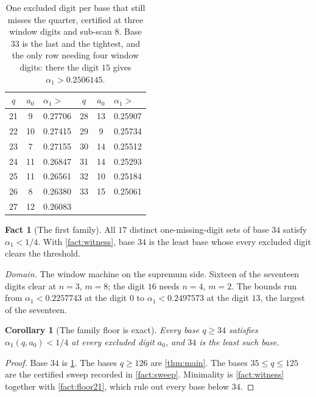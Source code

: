 \documentclass[11pt]{amsart}
\newtheorem{corollary}[theorem]{Corollary}
\theoremstyle{definition}
\newtheorem{fact}[theorem]{Fact}
\theoremstyle{remark}
\begin{document}
\begin{table}[t]
\centering
\small
\begin{tabular}{ccl@{\qquad}ccl}
\toprule
$q$ & $a_{0}$ & $\alpha_{1} >$ & $q$ & $a_{0}$ & $\alpha_{1} >$ \\
\midrule
21 & 9  & 0.27706 & 28 & 13 & 0.25907 \\
22 & 10 & 0.27415 & 29 & 9  & 0.25734 \\
23 & 7  & 0.27155 & 30 & 14 & 0.25512 \\
24 & 11 & 0.26847 & 31 & 14 & 0.25293 \\
25 & 11 & 0.26561 & 32 & 10 & 0.25184 \\
26 & 8  & 0.26380 & 33 & 15 & 0.25061 \\
27 & 12 & 0.26083 &    &    &         \\
\bottomrule
\end{tabular}
\caption{One excluded digit per base that still misses the quarter, certified at three window digits and sub-scan $8$. Base $33$ is the last and the tightest, and the only row needing four window digits: there the digit $15$ gives $\alpha_{1} > 0.2506145$.}
\label{tab:witness}
\end{table}

\begin{fact}[The first family]
\label{fact:floor34}
All $17$ distinct one-missing-digit sets of base $34$ satisfy $\alpha_{1} < 1/4$. With \cref{fact:witness}, base $34$ is the least base whose every excluded digit clears the threshold.

\emph{Domain.} The window machine on the supremum side. Sixteen of the seventeen digits clear at $n = 3$, $m = 8$; the digit $16$ needs $n = 4$, $m = 2$. The bounds run from $\alpha_{1} < 0.2257743$ at the digit $0$ to $\alpha_{1} < 0.2497573$ at the digit $13$, the largest of the seventeen.
\end{fact}

\begin{corollary}[The family floor is exact]
\label{cor:exact}
Every base $q \ge 34$ satisfies $\alpha_{1}(q, a_{0}) < 1/4$ at every excluded digit $a_{0}$, and $34$ is the least such base.
\end{corollary}

\begin{proof}
Base $34$ is \cref{fact:floor34}. The bases $q \ge 126$ are \cref{thm:main}. The bases $35 \le q \le 125$ are the certified sweep recorded in \cref{fact:sweep}. Minimality is \cref{fact:witness} together with \cref{fact:floor21}, which rule out every base below $34$.
\end{proof}
\end{document}
